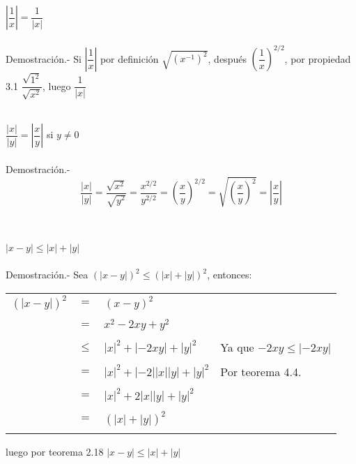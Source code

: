 \begin{teo}
$\left| \dfrac{1}{x} \right|=\dfrac{1}{|x|}$\\\\

Demostración.- \; Si $\left| \dfrac{1}{x} \right|$ por definición $\sqrt{(x^{-1})^2}$, después $\left( \dfrac{1}{x}\right) ^{2/2}$, por propiedad 3.1 \; $\dfrac{\sqrt{1^2}}{\sqrt{x^2}}$, luego $\dfrac{1}{|x|}$  \\\\
\end{teo}

\begin{teo}
$\dfrac{|x|}{|y|}=\left| \dfrac{x}{y} \right|$ si $y\neq 0$\\\\
Demostración.- $$ \dfrac{|x|}{|y|} = \dfrac{\sqrt{x^2}}{\sqrt{y^2}}=\dfrac{x^{2/2}}{y^{2/2}}=\left( \dfrac{x}{y} \right)^{2/2} = \sqrt{\left( \dfrac{x}{y} \right)^2}=\left| \dfrac{x}{y} \right| $$ \\\\
\end{teo}

\begin{teo}
$|x-y|\leq |x|+|y|$\\\\
Demostración.- \; Sea $(|x-y|)^2\leq( |x|+|y| )^2$, entonces:
\begin{center}
\begin{tabular}{r c l l}
$(|x-y|)^2$&$=$&$(x-y)^2$&\\\\
&$=$&$x^2-2xy+y^2$&\\\\
&$\leq$&$|x|^2+|-2xy|+|y|^2$&Ya que $-2xy\leq |-2xy|$\\\\
&$=$&$|x|^2+|-2||x||y|+|y|^2$&Por teorema 4.4.\\\\
&$=$&$|x|^2+2|x||y|+|y|^2$&\\\\
&$=$&$(|x|+|y|)^2$&\\\\
\end{tabular}
\end{center}
luego por teorema 2.18 \; $|x-y|\leq |x|+|y|$\\\\
\end{teo}

